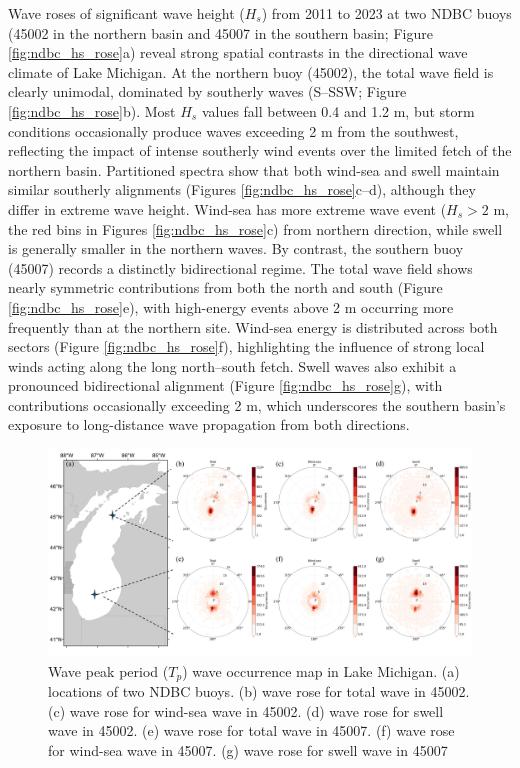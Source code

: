 Wave roses of significant wave height ($H_s$) from 2011 to 2023 at two NDBC
buoys (45002 in the northern basin and 45007 in the southern basin; Figure
\ref{fig:ndbc_hs_rose}a) reveal strong spatial contrasts in the directional wave
climate of Lake Michigan. At the northern buoy (45002), the total wave field is
clearly unimodal, dominated by southerly waves (S–SSW; Figure
\ref{fig:ndbc_hs_rose}b). Most $H_s$ values fall between 0.4 and 1.2 m, but
storm conditions occasionally produce waves exceeding 2 m from the southwest,
reflecting the impact of intense southerly wind events over the limited fetch of
the northern basin. Partitioned spectra show that both wind-sea and swell
maintain similar southerly alignments (Figures \ref{fig:ndbc_hs_rose}c–d),
although they differ in extreme wave height. Wind-sea has more extreme wave
event ($H_s > 2$ m, the red bins in Figures \ref{fig:ndbc_hs_rose}c) from
northern direction, while swell is generally smaller in the northern waves. By
contrast, the southern buoy (45007) records a distinctly bidirectional regime.
The total wave field shows nearly symmetric contributions from both the north
and south (Figure \ref{fig:ndbc_hs_rose}e), with high-energy events above 2 m
occurring more frequently than at the northern site. Wind-sea energy is
distributed across both sectors (Figure \ref{fig:ndbc_hs_rose}f), highlighting
the influence of strong local winds acting along the long north–south fetch.
Swell waves also exhibit a pronounced bidirectional alignment (Figure
\ref{fig:ndbc_hs_rose}g), with contributions occasionally exceeding 2 m, which
underscores the southern basin’s exposure to long-distance wave propagation from
both directions.

\begin{figure}[htbp]
  \centering
  \includegraphics[width=1\textwidth]{chapter4/resources/ndbc_occ_rose.png}
  \caption{Wave peak period ($T_p$) wave occurrence map in Lake Michigan. (a)
  locations of two NDBC buoys. (b) wave rose for total wave in 45002. (c) wave
  rose for wind-sea wave in 45002. (d) wave rose for swell wave in 45002. (e)
  wave rose for total wave in 45007. (f) wave rose for wind-sea wave in 45007.
  (g) wave rose for swell wave in 45007}
  \label{fig:ndbc_occ_rose}
\end{figure}

